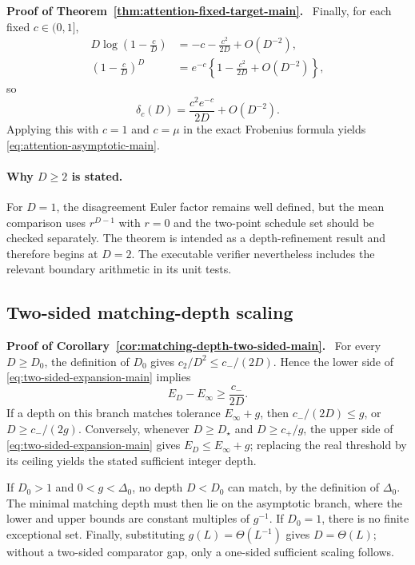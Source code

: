 \documentclass[twoside,11pt]{article}
\renewenvironment{proof}[1][Proof]{\par\noindent\textbf{#1.}\ }{\hfill\BlackBox\par\medskip}
\begin{document}
\begin{proof}[Proof of Theorem~\ref{thm:attention-fixed-target-main}]
Finally, for each fixed $c\in(0,1]$,
\begin{align}
 D\log\left(1-\frac cD\right)
 &=-c-\frac{c^2}{2D}+O(D^{-2}),\nonumber\\
 \left(1-\frac cD\right)^D
 &=e^{-c}\left\{1-\frac{c^2}{2D}+O(D^{-2})\right\},
 \label{eq:app-attn-series}
\end{align}
so
\begin{equation}
 \delta_c(D)=\frac{c^2e^{-c}}{2D}+O(D^{-2}).
 \label{eq:app-attn-delta-series}
\end{equation}
Applying this with $c=1$ and $c=\mu$ in the exact Frobenius formula yields
\eqref{eq:attention-asymptotic-main}.
\end{proof}

\paragraph{Why $D\ge2$ is stated.}
For $D=1$, the disagreement Euler factor remains well defined, but the mean
comparison uses $r^{D-1}$ with $r=0$ and the two-point schedule set should be
checked separately.  The theorem is intended as a depth-refinement result and
therefore begins at $D=2$.  The executable verifier nevertheless includes the
relevant boundary arithmetic in its unit tests.

\subsection{Two-sided matching-depth scaling}
\label{app:matching-depth-proof}

\begin{proof}[Proof of Corollary~\ref{cor:matching-depth-two-sided-main}]
For every $D\ge D_0$, the definition of $D_0$ gives
$c_2/D^2\le c_-/(2D)$.  Hence the lower side of
\eqref{eq:two-sided-expansion-main} implies
\begin{equation}
 E_D-E_\infty\ge\frac{c_-}{2D}.
 \label{eq:app-match-lower}
\end{equation}
If a depth on this branch matches tolerance $E_\infty+g$, then
$c_-/(2D)\le g$, or $D\ge c_-/(2g)$.  Conversely, whenever
$D\ge D_\star$ and $D\ge c_+/g$, the upper side of
\eqref{eq:two-sided-expansion-main} gives $E_D\le E_\infty+g$; replacing the
real threshold by its ceiling yields the stated sufficient integer depth.

If $D_0>1$ and $0<g<\Delta_0$, no depth $D<D_0$ can match, by the definition
of $\Delta_0$.  The minimal matching depth must then lie on the asymptotic
branch, where the lower and upper bounds are constant multiples of $g^{-1}$.
If $D_0=1$, there is no finite exceptional set.  Finally, substituting
$g(L)=\Theta(L^{-1})$ gives $D=\Theta(L)$; without a two-sided comparator gap,
only a one-sided sufficient scaling follows.
\end{proof}
\end{document}
